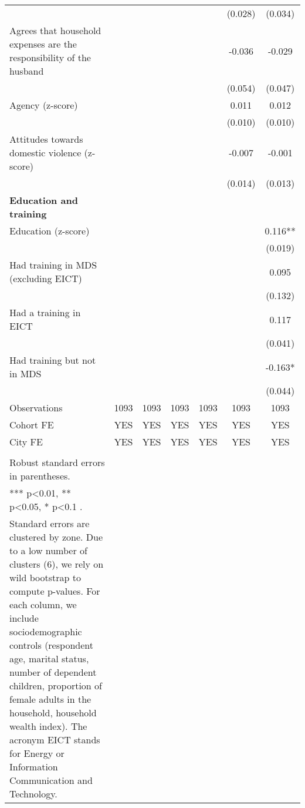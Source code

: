 \begin{landscape}
\begin{longtable}{m{9cm}cccccc}
&&&&&(0.028)&(0.034)\\
Agrees that household expenses are the responsibility of the husband&&&&&-0.036&-0.029\\
&&&&&(0.054)&(0.047)\\
Agency (z-score)&&&&&0.011&0.012\\
&&&&&(0.010)&(0.010)\\
Attitudes towards domestic violence (z-score) &&&&&-0.007&-0.001\\
&&&&&(0.014)&(0.013)\\
\textbf{Education and training}&&&&&&\\
Education (z-score)&&&&&&0.116**\\
&&&&&&(0.019)\\
Had training in MDS (excluding EICT)&&&&&&0.095\\
&&&&&&(0.132)\\
Had a training in EICT &&&&&&0.117\\
&&&&&&(0.041)\\
Had training but not in MDS &&&&&&-0.163*\\
&&&&&&(0.044)\\
Observations&1093&1093&1093&1093&1093&1093\\
Cohort FE&YES&YES&YES&YES&YES&YES\\
City FE&YES&YES&YES&YES&YES&YES\\
\midrule
\begin{minipage}{21cm}
\small{
{\textit Notes:} \\
Robust standard errors in parentheses. \\
*** p\textless{}0.01, ** p\textless{}0.05, * p\textless{}0.1 . \\
Standard errors are clustered by zone. Due to a low number of clusters (6), we rely on wild bootstrap to compute p-values. For each column, we include sociodemographic controls (respondent age, marital status, number of dependent children, proportion of female adults in the household, household wealth index). The acronym EICT stands for Energy or Information Communication and Technology.
}
\end{minipage} \\* \bottomrule
\end{longtable}
\end{landscape}
